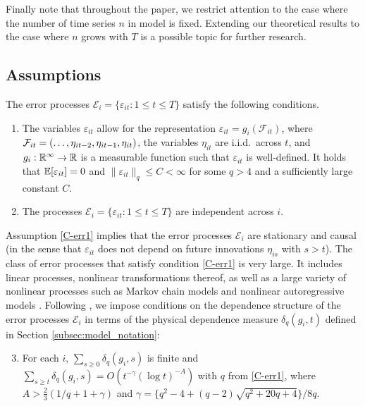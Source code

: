 \documentclass[12pt]{article}
\makeatletter
\renewcommand{\eqref}[1]{\tagform@{\ref{#1}}}
\makeatother
\begin{document}
Finally note that throughout the paper, we restrict attention to the case where the number of time series $n$ in model \eqref{eq:model_full} is fixed. Extending our theoretical results to the case where $n$ grows with $T$ is a possible topic for further research.


\subsection{Assumptions}\label{subsec:model_assumptions}


The error processes $\mathcal{E}_i = \{ \varepsilon_{it}: 1 \le t \le T\}$ satisfy the following conditions. 
\begin{enumerate}[label=(C\arabic*),leftmargin=1.05cm, itemsep=0pt, parsep=0pt, topsep=3pt]
\item \label{C-err1} 
The variables $\varepsilon_{it}$ allow for the representation $\varepsilon_{it} = g_i(\mathcal{F}_{it})$, where $\mathcal{F}_{it} = (\ldots,\eta_{it-2}, \linebreak \eta_{it-1},\eta_{it})$, the variables $\eta_{it}$ are i.i.d.\ across $t$, and $g_i: \mathbb{R}^\infty \rightarrow \mathbb{R}$ is a measurable function such that $\varepsilon_{it}$ is well-defined. It holds that $\mathbb{E}[\varepsilon_{it}] = 0$ and $\| \varepsilon_{it} \|_q \le C < \infty$ for some $q > 4$ and a sufficiently large constant $C$. 
\item \label{C-err2} The processes $\mathcal{E}_i = \{ \varepsilon_{it}: 1 \le t \le T\}$ are independent across $i$.
\end{enumerate}
Assumption \ref{C-err1} implies that the error processes $\mathcal{E}_i$ are stationary and causal (in the sense that $\varepsilon_{it}$ does not depend on future innovations $\eta_{is}$ with $s>t$). The class of error processes that satisfy condition \ref{C-err1} is very large. It includes linear processes, nonlinear transformations thereof, as well as a large variety of nonlinear processes such as Markov chain models and nonlinear autoregressive models \citep[][]{Wu2016}. Following \cite{Wu2005}, we impose conditions on the dependence structure of the error processes $\mathcal{E}_i$ in terms of the physical dependence measure $\delta_q(g_i, t)$ defined in Section \ref{subsec:model_notation}: 
\begin{enumerate}[label=(C\arabic*),leftmargin=1.05cm, itemsep=0pt, parsep=0pt, topsep=3pt]
\setcounter{enumi}{2}
\item \label{C-err3} For each $i$, $\sum\nolimits_{s \ge 0} \delta_q(g_i, s)$ is finite and $\sum\nolimits_{s \ge t} \delta_q(g_i, s) = O ( t^{-\gamma} (\log t)^{-A})$ with $q$ from \ref{C-err1}, where $A > \frac{2}{3} (1/q + 1 + \gamma)$ and $\gamma = \{q^2 - 4 + (q-2) \sqrt{q^2 + 20q + 4}\} / 8q$. 
\end{enumerate}
\end{document}

